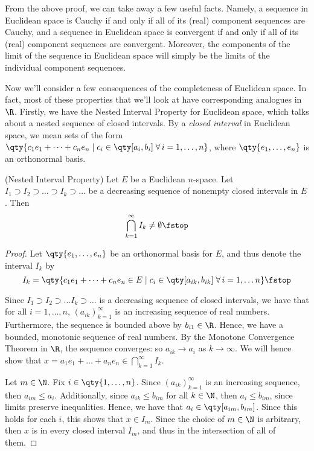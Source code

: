 From the above proof, we can take away a few useful facts. Namely, a sequence in Euclidean space is Cauchy if and only if all of its (real) component sequences are Cauchy, and a sequence in Euclidean space is convergent if and only if all of its (real) component sequences are convergent. Moreover, the components of the limit of the sequence in Euclidean space will simply be the limits of the individual component sequences.

\vspace{3mm}

Now we'll consider a few consequences of the completeness of Euclidean space. In fact, most of these properties that we'll look at have corresponding analogues in \( \R \). Firstly, we have the Nested Interval Property for Euclidean space, which talks about a nested sequence of closed intervals. By a \emph{closed interval} in Euclidean space, we mean sets of the form \( \qty{c_1e_1+\dots+c_ne_n\mid c_i\in\qty[a_i,b_i] \;\forall\,i=1,\dots,n}  \), where \( \qty{e_1,\dots,e_n} \) is an orthonormal basis.

\begin{theorem}
  \label{thm:NIP}
  (Nested Interval Property) Let \( E \) be a Euclidean \( n \)-space. Let \( I_1\supset I_2\supset\dots\supset I_k\supset\dots \) be a decreasing sequence of nonempty closed intervals in \( E \). Then
  \[ \bigcap_{k=1}^\infty I_k\neq\emptyset\fstop \]
\end{theorem}
\begin{proof}
  Let \( \qty{e_1,\dots,e_n} \) be an orthonormal basis for \( E \), and thus denote the interval \( I_k \) by
  \[ I_k=\qty{c_1e_1+\dots +c_ne_n\in E\mid c_i\in \qty[a_{ik},b_{ik}]\;\forall\,i=1,\dots n}\fstop \]
  
  Since \( I_1\supset I_2\supset\dots I_k\supset\dots \) is a decreasing sequence of closed intervals, we have that for all \( i=1,\dots,n \), \( (a_{ik})_{k=1}^\infty \) is an increasing sequence of real numbers. Furthermore, the sequence is bounded above by \( b_{i1}\in\R \). Hence, we have a bounded, monotonic sequence of real numbers. By the Monotone Convergence Theorem in \( \R \), the sequence converges: so \( a_{ik}\to a_i \) as \( k\to\infty \). We will hence show that \( x=a_1e_1+\dots+a_ne_n\in\bigcap_{k=1}^\infty I_k \).

  \vspace{3mm}

  Let \( m\in\N \). Fix \( i\in\qty{1,\dots,n} \). Since \( (a_{ik})_{k=1}^\infty \) is an increasing sequence, then \( a_{im}\leq a_i \). Additionally, since \( a_{ik}\leq b_{im} \) for all \( k\in\N \), then \( a_i\leq b_{im} \), since limits preserve inequalities. Hence, we have that \( a_i\in\qty[a_{im},b_{im}] \). Since this holds for each \( i \), this shows that \( x\in I_m \). Since the choice of \( m\in\N \) is arbitrary, then \( x \) is in every closed interval \( I_m \), and thus in the intersection of all of them.
\end{proof}

